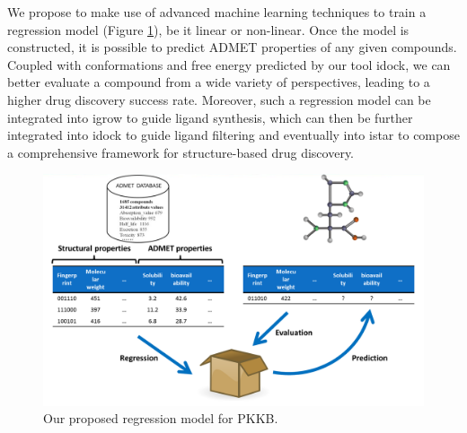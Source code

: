 We propose to make use of advanced machine learning techniques to train a regression model (Figure \ref{PKKB:Regression}), be it linear or non-linear. Once the model is constructed, it is possible to predict ADMET properties of any given compounds. Coupled with conformations and free energy predicted by our tool idock, we can better evaluate a compound from a wide variety of perspectives, leading to a higher drug discovery success rate. Moreover, such a regression model can be integrated into igrow to guide ligand synthesis, which can then be further integrated into idock to guide ligand filtering and eventually into istar to compose a comprehensive framework for structure-based drug discovery.

\begin{figure}
\centering
\includegraphics[width=\linewidth]{PKKB/Regression.png}
\caption{Our proposed regression model for PKKB.}
\label{PKKB:Regression}
\end{figure}

\chapterend
